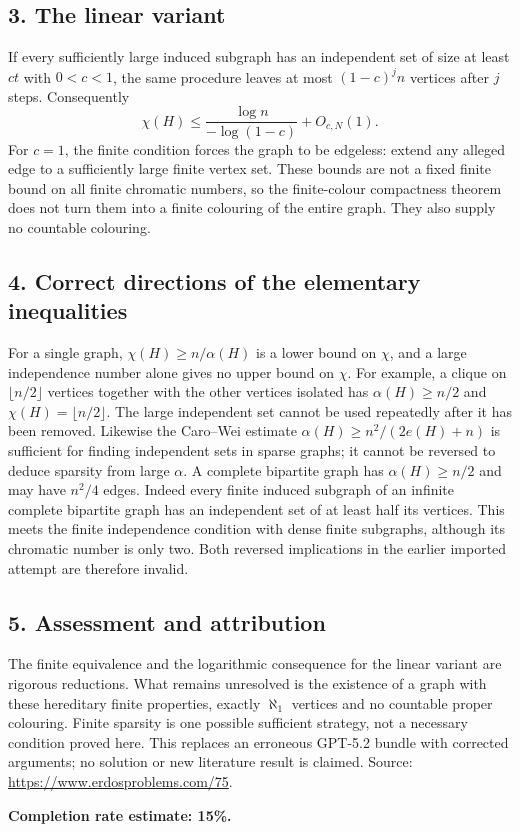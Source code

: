 \subsection*{3. The linear variant}
If every sufficiently large induced subgraph has an independent set of size at least $ct$ with $0<c<1$, the same procedure leaves at most $(1-c)^j n$ vertices after $j$ steps. Consequently
\[
 \chi(H)\le\frac{\log n}{-\log(1-c)}+O_{c,N}(1).
\]
For $c=1$, the finite condition forces the graph to be edgeless: extend any alleged edge to a sufficiently large finite vertex set. These bounds are not a fixed finite bound on all finite chromatic numbers, so the finite-colour compactness theorem does not turn them into a finite colouring of the entire graph. They also supply no countable colouring.

\subsection*{4. Correct directions of the elementary inequalities}
For a single graph, $\chi(H)\ge n/\alpha(H)$ is a lower bound on $\chi$, and a large independence number alone gives no upper bound on $\chi$. For example, a clique on $\lfloor n/2\rfloor$ vertices together with the other vertices isolated has $\alpha(H)\ge n/2$ and $\chi(H)=\lfloor n/2\rfloor$. The large independent set cannot be used repeatedly after it has been removed.
Likewise the Caro--Wei estimate $\alpha(H)\ge n^2/(2e(H)+n)$ is sufficient for finding independent sets in sparse graphs; it cannot be reversed to deduce sparsity from large $\alpha$. A complete bipartite graph has $\alpha(H)\ge n/2$ and may have $n^2/4$ edges. Indeed every finite induced subgraph of an infinite complete bipartite graph has an independent set of at least half its vertices. This meets the finite independence condition with dense finite subgraphs, although its chromatic number is only two. Both reversed implications in the earlier imported attempt are therefore invalid.

\subsection*{5. Assessment and attribution}
The finite equivalence and the logarithmic consequence for the linear variant are rigorous reductions. What remains unresolved is the existence of a graph with these hereditary finite properties, exactly $\aleph_1$ vertices and no countable proper colouring. Finite sparsity is one possible sufficient strategy, not a necessary condition proved here. This replaces an erroneous GPT-5.2 bundle with corrected arguments; no solution or new literature result is claimed.
Source: \url{https://www.erdosproblems.com/75}.

\textbf{Completion rate estimate: 15\%.}
